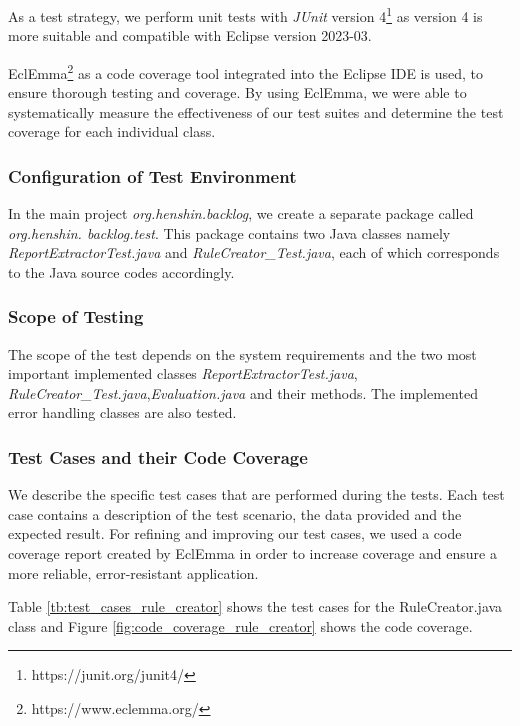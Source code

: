 As a test strategy, we perform unit tests with \textit{JUnit} version 4\footnote{https://junit.org/junit4/} as version 4 is more suitable and compatible with Eclipse version 2023-03.

EclEmma\footnote{https://www.eclemma.org/} as a code coverage tool integrated into the Eclipse IDE is used, to ensure thorough testing and coverage. By using EclEmma, we were able to systematically measure the effectiveness of our test suites and determine the test coverage for each individual class.
\subsubsection*{Configuration of Test Environment}
In the main project \textit{org.henshin.backlog}, we create a separate package called \textit{org.henshin. backlog.test}. This package contains two Java classes namely \textit{ReportExtractorTest.java} and \textit{RuleCreator\_Test.java}, each of which corresponds to the Java source codes accordingly.
\subsubsection*{Scope of Testing}
The scope of the test depends on the system requirements and the two most important implemented classes \textit{ReportExtractorTest.java}, \textit{RuleCreator\_Test.java},\textit{Evaluation.java} and their methods. The implemented error handling classes are also tested.
\subsubsection*{Test Cases and their Code Coverage}
We describe the specific test cases that are performed during the tests. Each test case contains a description of the test scenario, the data provided and the expected result. For refining and improving our test cases, we used a code coverage report created by EclEmma in order to increase coverage and ensure a more reliable, error-resistant application.

Table \ref{tb:test_cases_rule_creator} shows the test cases for the RuleCreator.java class and Figure \ref{fig:code_coverage_rule_creator} shows the code coverage.

